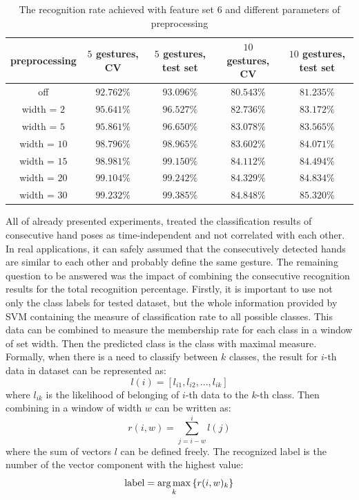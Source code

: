 \begin{table}[htp!]
\begin{center}
	\label{staticpre}
	\caption{The recognition rate achieved with feature set $6$ and different parameters of preprocessing}
    \begin{tabular}{|c|c|c|c|c|}
    \hline
    preprocessing                                                   & $5$ gestures, CV & $5$ gestures, test set & $10$ gestures, CV  & $10$ gestures, test set \\ \hline
    off                     & $92.762\%$ & $93.096\%$  & $80.543\%$ & $81.235\%$ \\ \hline
    width = $2$               & $95.641\%$ & $96.527\%$  & $82.736\%$ & $83.172\%$ \\ \hline
    width = $5$               & $95.861\%$ & $96.650\%$  & $83.078\%$ & $83.565\%$ \\ \hline
    width = $10$              & $98.796\%$ & $98.965\%$  & $83.602\%$ & $84.071\%$ \\ \hline
    width = $15$              & $98.981\%$ & $99.150\%$  & $84.112\%$ & $84.494\%$ \\ \hline
    width = $20$              & $99.104\%$ & $99.242\%$  & $84.329\%$ & $84.834\%$ \\ \hline
    width = $30$              & $99.232\%$ & $99.385\%$  & $84.848\%$ & $85.320\%$ \\ \hline
    \end{tabular}
    \end{center}
\end{table}

All of already presented experiments, treated the classification results of consecutive hand poses as time-independent and not correlated with each other.
In real applications, it can safely assumed that the consecutively detected hands are similar to each other and probably define the same gesture.
The remaining question to be answered was the impact of combining the consecutive recognition results for the total recognition percentage.
Firstly, it is important to use not only the class labels for tested dataset, but the whole information provided by SVM containing the measure of classification rate to all possible classes.
This data can be combined to measure the membership rate for each class in a window of set width.
Then the predicted class is the class with maximal measure.
Formally, when there is a need to classify between $k$ classes, the result for $i$-th data in dataset can be represented as:
\begin {equation}
l(i) = [l_{i1}, l_{i2}, ..., l_{ik}]
\end{equation}
where $l_{ik}$ is the likelihood of belonging of $i$-th data to the $k$-th class.
Then combining in a window of width $w$ can be written as:
\begin{equation}
r(i,w) = \sum_{j=i-w}^{i}{ l(j) }
\end{equation}
where the sum of vectors $l$ can be defined freely.
The recognized label is the number of the vector component with the highest value:
\begin{equation}
\mathrm{label} = \operatorname*{arg\,max}_{k}{\{r(i,w)_k\}}
\end{equation}


